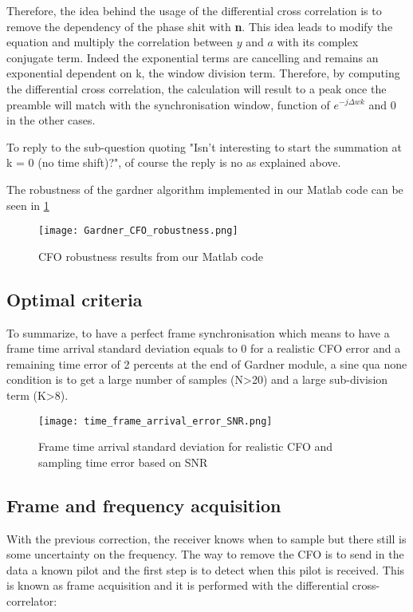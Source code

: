Therefore, the idea behind the usage of the differential cross correlation is to remove the dependency of the phase shit with \textbf{n}.
This idea leads to modify the equation and multiply the correlation between $y$ and $a$ with its complex conjugate term. Indeed the exponential 
terms are cancelling and remains an exponential dependent on k, the window division term.
Therefore, by computing the differential cross correlation, the calculation will result to a peak once the preamble will match with the synchronisation
 window, function of $e^{-j\Delta wk}$ and 0 in the other cases.
 
To reply to the sub-question quoting "Isn’t interesting to start the summation at k = 0 (no time shift)?", of course the reply is no as explained above.

The robustness of the gardner algorithm implemented in our Matlab code can be seen in \ref{fig:Gardner_CFO_robustness}

\begin{figure}[H]
    \centering
    \texttt{[image: Gardner\_CFO\_robustness.png]}
    \caption{CFO robustness results from our Matlab code}
    \label{fig:Gardner_CFO_robustness}
\end{figure}

\subsection{Optimal criteria}

To summarize, to have a perfect frame synchronisation which means to have a frame time arrival standard deviation equals to 0 for a realistic CFO
error and a remaining time error of 2 percents at the end of Gardner module, a sine qua none condition is to get a large number of 
samples (N>20) and a large sub-division term (K>8).

\begin{figure}[H]
    \centering
    \texttt{[image: time\_frame\_arrival\_error\_SNR.png]}
    \caption{Frame time arrival standard deviation for realistic CFO and sampling time error based on SNR}
    \label{fig:time_frame_arrival_error_SNR}
\end{figure}
\subsection{Frame and frequency acquisition}

With the previous correction, the receiver knows when to sample but there still is some uncertainty on the frequency. The way to remove the CFO is to send in the data a known pilot and the first step is to detect when this pilot is received. This is known as frame acquisition and it is performed with the differential cross-correlator:

